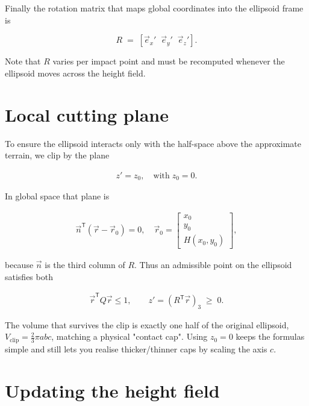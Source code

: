 Finally the rotation matrix that maps global coordinates into the ellipsoid frame is

\begin{equation}
    \label{eq:app-rotation-from-normal} R \;=\;
    \left[ 
    \vec e_x' \;\; \vec e_y' \;\; \vec e_z'
    \right].
\end{equation}

Note that $R$ varies per impact point and must be recomputed whenever the ellipsoid moves across the height field.

\section{Local cutting plane}
\label{app:ellipsoid-cutting-plane}
To ensure the ellipsoid interacts only with the half-space above the approximate terrain, we clip by the plane

\begin{align}
    z' = z_0, 
    \quad\text{with}\; z_0 = 0.
\end{align}

In global space that plane is

\begin{align}
    \vec n^{\mathsf T}( \vec{r}- \vec{r}_0)=0,
    \quad
     \vec{r}_0 = 
    \begin{bmatrix} 
        x_0 \\ 
        y_0 \\ 
        H(x_0,y_0)
    \end{bmatrix},
\end{align}

because $\vec n$ is the third column of $R$.  Thus an admissible point on the ellipsoid satisfies both

\begin{align}
     \vec{r}^{\mathsf T}Q \vec{r} \le 1,
    \qquad z' = \left(R^{\mathsf T} \vec{r}\right)_3 \;\ge\; 0.
\end{align}

The volume that survives the clip is exactly one half of the original ellipsoid, $V_\text{clip} = \frac{2}{3} \pi abc$, matching a physical "contact cap".  Using $z_0=0$ keeps the formulas simple and still lets you realise thicker/thinner caps by scaling the axis $c$.

\section{Updating the height field}
\label{app:ellipsoid-height-update}


